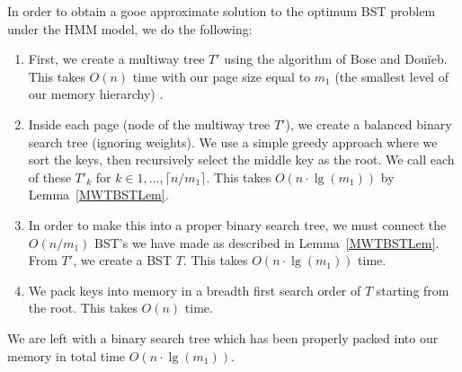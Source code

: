 \documentclass[letterpaper,12pt,titlepage,oneside,final]{book}
\theoremstyle{plain}
\begin{document}
In order to obtain a gooe approximate solution to the optimum BST problem under the HMM model, we do the following:

\begin{enumerate}
\item First, we create a multiway tree $T'$ using the algorithm of Bose and Dou\"{i}eb. This takes $O(n)$ time with our page size equal to $m_1$ (the smallest level of our memory hierarchy) \cite{bose2009efficient}.

\item Inside each page (node of the multiway tree $T'$), we create a balanced binary search tree (ignoring weights). We use a simple greedy approach where we sort the keys, then recursively select the middle key as the root.  We call each of these $T'_k$ for $k \in {1,...,\lceil n/m_1 \rceil}$. This takes $O(n\cdot\lg(m_1))$ by Lemma~\ref{MWTBSTLem}.

\item In order to make this into a proper binary search tree, we must connect the $O(n/m_1)$ BST's we have made as described in Lemma~\ref{MWTBSTLem}. From $T'$, we create a BST $T$. This takes $O(n\cdot\lg(m_1))$ time.

\item We pack keys into memory in a breadth first search order of $T$ starting from the root. This takes $O(n)$ time.

\end{enumerate}

\noindent We are left with a binary search tree which has been properly packed into our memory in total time $O(n\cdot\lg(m_1))$.
\end{document}

